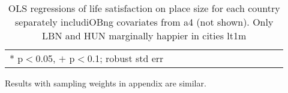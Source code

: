 \documentclass[10pt, letterpaper]{article}
\begin{document}
\begin{spacing}{1.4}
\begin{spacing}{.9} \begin{table}[H]\centering   \begin{scriptsize} \begin{tabular}{p{.5in}p{.5in}p{.5in}p{.5in}p{.5in}p{.5in}p{.5in}p{.5in}p{.5in}p{.5in}p{.5
                                                                      in}p{.5in}p{.5
                                                                      in}}\hline
                                                                      
                                                                      \hline *
                                                                      p$<$0.05,
                                                                      $+$
                                                                      p$<$0.1;
                                                                      robust std
                                                                      err \end{tabular}\end{scriptsize}\caption{\label{a4cou}OLS
                                                                    regressions
                                                                    of life satisfaction on
                                                                    place size
                                                                    for each
                                                                    country
                                                                    separately
                                                                    includiOBng
                                                                    covariates
                                                                    from a4 (not
                                                                    shown). Only
                                                                  LBN and HUN
                                                                  marginally
                                                                  happier in
                                                                  cities lt1m
                                                           }\end{table} \end{spacing}


Results with sampling weights in appendix are similar.
                                                       







\end{spacing}
\end{document}
